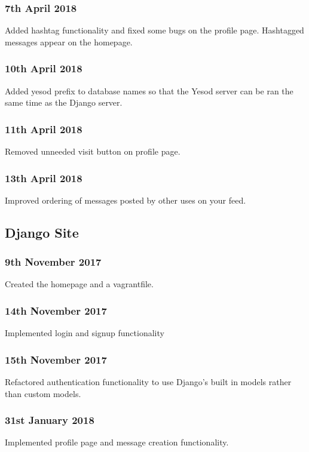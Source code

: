 \subsubsection{7th April 2018}
Added hashtag functionality and fixed some bugs on the profile page. Hashtagged messages
appear on the homepage.

\subsubsection{10th April 2018}
Added yesod prefix to database names so that the Yesod server can be ran the same
time as the Django server.

\subsubsection{11th April 2018}
Removed unneeded visit button on profile page.

\subsubsection{13th April 2018}
Improved ordering of messages posted by other uses on your feed.

\subsection{Django Site}

\subsubsection{9th November 2017}
Created the homepage and a vagrantfile.

\subsubsection{14th November 2017}
Implemented login and signup functionality

\subsubsection{15th November 2017}
Refactored authentication functionality to use Django's built in models rather than custom models.

\subsubsection{31st January 2018}
Implemented profile page and message creation functionality.

